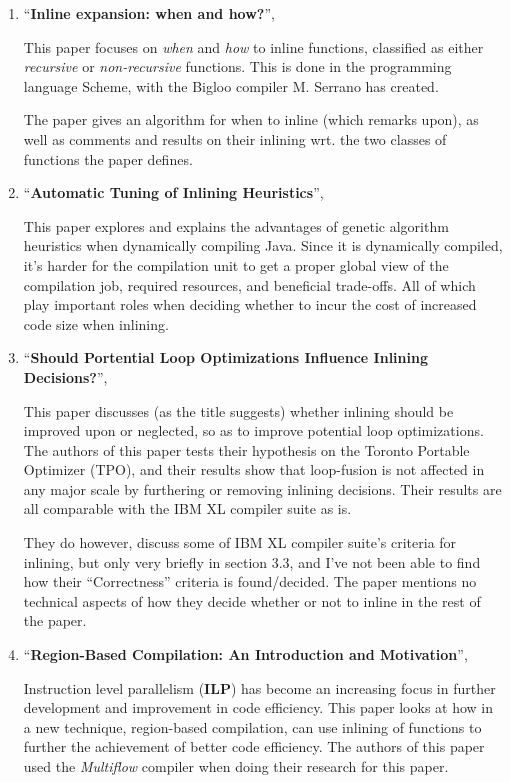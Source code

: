 \begin{enumerate}
	\item ``\textbf{Inline expansion: when and how?}'',
\cite{InlineWhenHowSerrano}

This paper focuses on \textit{when} and \textit{how} to inline functions,
classified as either \textit{recursive} or \textit{non-recursive} functions.
This is done in the programming language Scheme, with the
Bigloo compiler M. Serrano has created.

The paper gives an algorithm for when to inline (which \cite{GHCPaper} remarks
upon), as well as comments and results on their inlining wrt. the two classes of
functions the paper defines.

	\item ``\textbf{Automatic Tuning of Inlining Heuristics}'',
\cite{AutoTuningJavaHeuristics}

This paper explores and explains the advantages of genetic algorithm heuristics
when dynamically compiling Java. Since it is dynamically compiled, it's harder
for the compilation unit to get a proper global view of the compilation job,
required resources, and beneficial trade-offs. All of which play important roles
when deciding whether to incur the cost of increased code size when inlining.

	\item ``\textbf{Should Portential Loop Optimizations Influence Inlining Decisions?}'',

This paper discusses (as the title suggests) whether inlining should be improved
upon or neglected, so as to improve potential loop optimizations. The authors of
this paper tests their hypothesis on the Toronto Portable Optimizer (TPO), and
their results show that loop-fusion is not affected in any major scale by
furthering or removing inlining decisions. Their results are all comparable with
the IBM XL compiler suite as is.

They do however, discuss some of IBM XL compiler suite's criteria for inlining,
but only very briefly in section 3.3, and I've not been able to find how their
``Correctness'' criteria is found/decided. The paper mentions no technical aspects of how they decide whether or not to inline in the rest of the paper.

	\item ``\textbf{Region-Based Compilation: An Introduction and Motivation}'',

Instruction level parallelism (\textbf{ILP}) has become an increasing focus in
further development and improvement in code efficiency. This paper looks at how
in a new technique, region-based compilation, can use inlining of functions to
further the achievement of better code efficiency. The authors of this paper
used the \textit{Multiflow} compiler when doing their research for this paper.


\end{enumerate}
